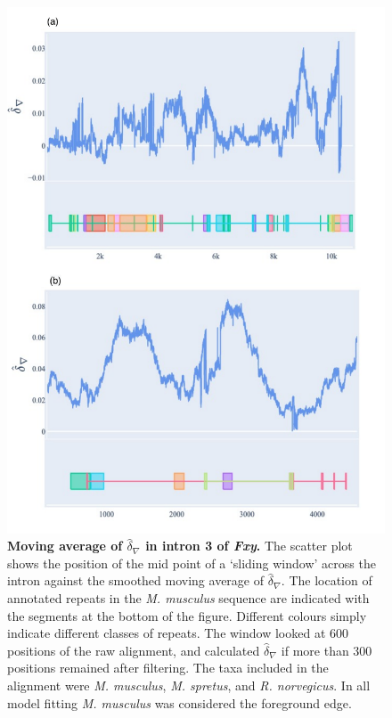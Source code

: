 \begin{figure}[htbp]
\centering
\includegraphics[width=\textwidth]{figures/plots/rodent/dconv-intron3_4.pdf}
\caption{\textbf{Moving average of $\hat\delta_\nabla$ in intron 3 of \textit{Fxy}.} The scatter plot shows the position of the mid point of a `sliding window' across the intron against the smoothed moving average of $\hat\delta_\nabla$. The location of annotated repeats in the \textit{M. musculus} sequence are indicated with the segments at the bottom of the figure. Different colours simply indicate different classes of repeats. The window looked at 600 positions of the raw alignment, and calculated $\hat\delta_\nabla$ if more than 300 positions remained after filtering. The taxa included in the alignment were \textit{M. musculus}, \textit{M. spretus}, and \textit{R. norvegicus}. In all model fitting \textit{M. musculus} was considered the foreground edge. }
\label{fig:rodent/d-conv/intron3_4}
\end{figure}